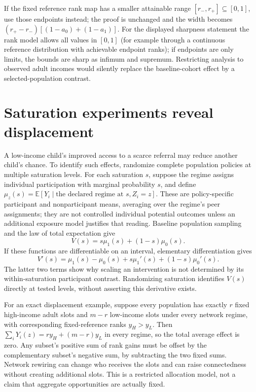 \documentclass[11pt]{article}
\theoremstyle{remark}\newtheorem{remark}[theorem]{Remark}
\newcommand{\E}{\mathbb E}
\begin{document}
If the fixed reference rank map has a smaller attainable range $[r_-,r_+]\subseteq[0,1]$, use those endpoints instead; the proof is unchanged and the width becomes $(r_+-r_-)[(1-a_0)+(1-a_1)]$. For the displayed sharpness statement the rank model allows all values in $[0,1]$ (for example through a continuous reference distribution with achievable endpoint ranks); if endpoints are only limits, the bounds are sharp as infimum and supremum. Restricting analysis to observed adult incomes would silently replace the baseline-cohort effect by a selected-population contrast.

\section{Saturation experiments reveal displacement}
A low-income child's improved access to a scarce referral may reduce another child's chance. To identify such effects, randomize complete population policies at multiple saturation levels. For each saturation $s$, suppose the regime assigns individual participation with marginal probability $s$, and define
$\mu_z(s)=\E[Y_i\mid\text{the declared regime at }s,                                    Z_i=z]$.
These are policy-specific participant and nonparticipant means, averaging over the regime's peer assignments; they are not controlled individual potential outcomes unless an additional exposure model justifies that reading. Baseline population sampling and the law of total expectation give
\[
 V(s)=s\mu_1(s)+(1-s)\mu_0(s).
\]
If these functions are differentiable on an interval, elementary differentiation gives
\[
 V'(s)=\mu_1(s)-\mu_0(s)+s\mu_1'(s)+(1-s)\mu_0'(s).
\]
The latter two terms show why scaling an intervention is not determined by its within-saturation participant contrast. Randomizing saturation identifies $V(s)$ directly at tested levels, without asserting this derivative exists.

For an exact displacement example, suppose every population has exactly $r$ fixed high-income adult slots and $m-r$ low-income slots under every network regime, with corresponding fixed-reference ranks $y_H>y_L$. Then
$\sum_iY_i(z)=ry_H+(m-r)y_L$ in every regime, so the total average effect is zero. Any subset's positive sum of rank gains must be offset by the complementary subset's negative sum, by subtracting the two fixed sums. Network rewiring can change who receives the slots and can raise connectedness without creating additional slots. This is a restricted allocation model, not a claim that aggregate opportunities are actually fixed.
\end{document}
